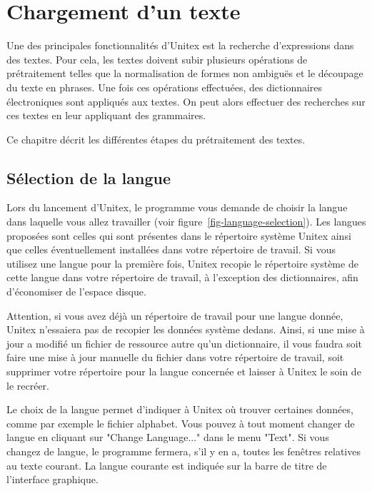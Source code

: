 \chapter{Chargement d’un texte}
\label{chap-text}

\noindent Une des principales fonctionnalités d’Unitex est la recherche d’expressions dans des
textes. Pour cela, les textes doivent subir plusieurs opérations de prétraitement telles que
la normalisation de formes non ambiguës et le découpage du texte en phrases. Une fois
ces opérations effectuées, des dictionnaires électroniques sont appliqués aux textes. On peut
alors effectuer des recherches sur ces textes en leur appliquant des grammaires.


\bigskip
\noindent Ce chapitre décrit les différentes étapes du prétraitement des textes.


\section{Sélection de la langue}
\noindent Lors du lancement d’Unitex, le programme vous demande de choisir la langue dans laquelle
vous allez travailler (voir figure~\ref{fig-language-selection}). Les langues proposées sont celles
qui sont présentes dans le répertoire système Unitex
ainsi que celles éventuellement installées dans votre
répertoire de travail. Si vous utilisez une langue pour la première fois,
Unitex recopie le répertoire système de cette langue dans votre répertoire de travail, à l’exception
des  dictionnaires, afin d’économiser de l’espace disque.


\bigskip
\noindent Attention, si vous avez déjà un répertoire de travail pour une langue donnée, Unitex
n’essaiera pas de recopier les données système dedans. Ainsi, si une mise à jour a modifié un
fichier de ressource autre qu’un dictionnaire, il vous faudra soit faire une mise à jour manuelle
du fichier dans votre répertoire de travail, soit supprimer votre répertoire pour la langue
concernée et laisser à Unitex le soin de le recréer.


\bigskip
\noindent 
Le choix de la langue permet d’indiquer à Unitex où trouver certaines données, comme par exemple le
fichier alphabet.  Vous pouvez à tout moment changer de langue en cliquant
sur "Change Language..." dans le menu "Text". Si vous changez de langue, le programme fermera,
s’il y en a, toutes les fenêtres relatives au texte courant. La langue courante est indiquée sur
la barre de titre de l’interface graphique.


